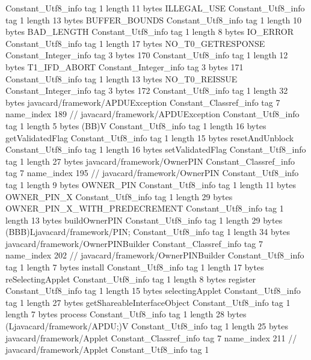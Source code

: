 {{{		}
		Constant_Utf8_info {
			tag	1
			length	11
			bytes	ILLEGAL_USE
		}
		Constant_Utf8_info {
			tag	1
			length	13
			bytes	BUFFER_BOUNDS
		}
		Constant_Utf8_info {
			tag	1
			length	10
			bytes	BAD_LENGTH
		}
		Constant_Utf8_info {
			tag	1
			length	8
			bytes	IO_ERROR
		}
		Constant_Utf8_info {
			tag	1
			length	17
			bytes	NO_T0_GETRESPONSE
		}
		Constant_Integer_info {
			tag	3
			bytes	170
		}
		Constant_Utf8_info {
			tag	1
			length	12
			bytes	T1_IFD_ABORT
		}
		Constant_Integer_info {
			tag	3
			bytes	171
		}
		Constant_Utf8_info {
			tag	1
			length	13
			bytes	NO_T0_REISSUE
		}
		Constant_Integer_info {
			tag	3
			bytes	172
		}
		Constant_Utf8_info {
			tag	1
			length	32
			bytes	javacard/framework/APDUException
		}
		Constant_Classref_info {
			tag	7
			name_index	189		// javacard/framework/APDUException
		}
		Constant_Utf8_info {
			tag	1
			length	5
			bytes	(BB)V
		}
		Constant_Utf8_info {
			tag	1
			length	16
			bytes	getValidatedFlag
		}
		Constant_Utf8_info {
			tag	1
			length	15
			bytes	resetAndUnblock
		}
		Constant_Utf8_info {
			tag	1
			length	16
			bytes	setValidatedFlag
		}
		Constant_Utf8_info {
			tag	1
			length	27
			bytes	javacard/framework/OwnerPIN
		}
		Constant_Classref_info {
			tag	7
			name_index	195		// javacard/framework/OwnerPIN
		}
		Constant_Utf8_info {
			tag	1
			length	9
			bytes	OWNER_PIN
		}
		Constant_Utf8_info {
			tag	1
			length	11
			bytes	OWNER_PIN_X
		}
		Constant_Utf8_info {
			tag	1
			length	29
			bytes	OWNER_PIN_X_WITH_PREDECREMENT
		}
		Constant_Utf8_info {
			tag	1
			length	13
			bytes	buildOwnerPIN
		}
		Constant_Utf8_info {
			tag	1
			length	29
			bytes	(BBB)Ljavacard/framework/PIN;
		}
		Constant_Utf8_info {
			tag	1
			length	34
			bytes	javacard/framework/OwnerPINBuilder
		}
		Constant_Classref_info {
			tag	7
			name_index	202		// javacard/framework/OwnerPINBuilder
		}
		Constant_Utf8_info {
			tag	1
			length	7
			bytes	install
		}
		Constant_Utf8_info {
			tag	1
			length	17
			bytes	reSelectingApplet
		}
		Constant_Utf8_info {
			tag	1
			length	8
			bytes	register
		}
		Constant_Utf8_info {
			tag	1
			length	15
			bytes	selectingApplet
		}
		Constant_Utf8_info {
			tag	1
			length	27
			bytes	getShareableInterfaceObject
		}
		Constant_Utf8_info {
			tag	1
			length	7
			bytes	process
		}
		Constant_Utf8_info {
			tag	1
			length	28
			bytes	(Ljavacard/framework/APDU;)V
		}
		Constant_Utf8_info {
			tag	1
			length	25
			bytes	javacard/framework/Applet
		}
		Constant_Classref_info {
			tag	7
			name_index	211		// javacard/framework/Applet
		}
		Constant_Utf8_info {
			tag	1
}}}
